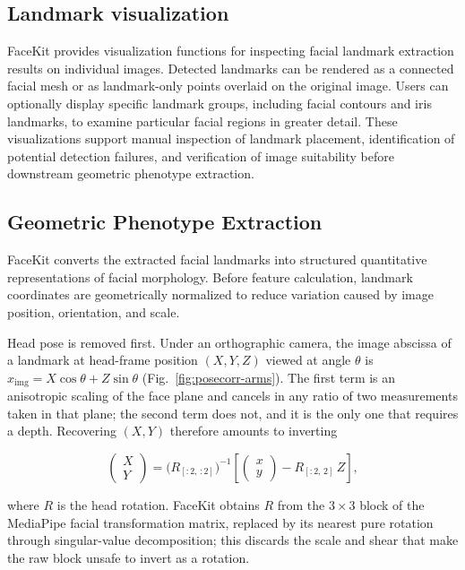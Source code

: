 \documentclass[11pt]{article}
\begin{document}
\subsection{Landmark visualization}

FaceKit provides visualization functions for inspecting facial landmark extraction results on individual images. Detected landmarks can be rendered as a connected facial mesh or as landmark-only points overlaid on the original image. Users can optionally display specific landmark groups, including facial contours and iris landmarks, to examine particular facial regions in greater detail. These visualizations support manual inspection of landmark placement, identification of potential detection failures, and verification of image suitability before downstream geometric phenotype extraction.

\subsection{Geometric Phenotype Extraction}

FaceKit converts the extracted facial landmarks into structured quantitative
representations of facial morphology. Before feature calculation, landmark
coordinates are geometrically normalized to reduce variation caused by image
position, orientation, and scale.

Head pose is removed first. Under an orthographic camera, the image abscissa of a
landmark at head-frame position $(X, Y, Z)$ viewed at angle $\theta$ is
$x_{\mathrm{img}} = X\cos\theta + Z\sin\theta$
(Fig.~\ref{fig:posecorr-arms}). The first term is an
anisotropic scaling of the face plane and cancels in any ratio of two
measurements taken in that plane; the second term does not, and it is the only
one that requires a depth. Recovering $(X, Y)$ therefore amounts to inverting

\begin{equation}
\begin{pmatrix} X \\ Y \end{pmatrix}
  = \bigl(R_{[:2,\,:2]}\bigr)^{-1}
    \left[ \begin{pmatrix} x \\ y \end{pmatrix} - R_{[:2,\,2]}\, Z \right],
\label{eq:derot}
\end{equation}

where $R$ is the head rotation. FaceKit obtains $R$ from the $3\times3$ block of
the MediaPipe facial transformation matrix, replaced by its nearest pure
rotation through singular-value decomposition; this discards the scale and shear
that make the raw block unsafe to invert as a rotation.
\end{document}
